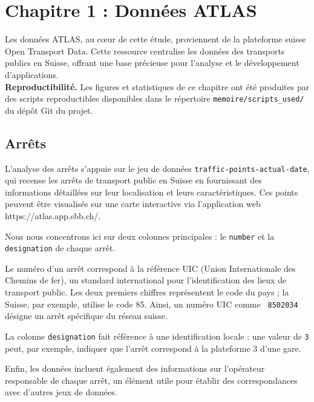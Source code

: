 \chapter{Chapitre 1 : Données ATLAS}

Les données ATLAS, au cœur de cette étude, proviennent de la plateforme suisse Open Transport Data. Cette ressource centralise les données des transports publics en Suisse, offrant une base précieuse pour l'analyse et le développement d'applications.\\

\medskip
\noindent\textbf{Reproductibilité.} Les figures et statistiques de ce chapitre ont été produites par des scripts reproductibles disponibles dans le répertoire \texttt{memoire/scripts\_used/} du dépôt Git du projet.


\section{Arrêts}

L'analyse des arrêts s'appuie sur le jeu de données \texttt{traffic-points-actual-date}, qui recense les arrêts de transport public en Suisse en fournissant des informations détaillées sur leur localisation et leurs caractéristiques. Ces points peuvent être visualisés sur une carte interactive via l’application web https://atlas.app.sbb.ch/.

Nous nous concentrons ici sur deux colonnes principales : le \texttt{number} et la \texttt{designation} de chaque arrêt.

Le numéro d’un arrêt correspond à la référence UIC (Union Internationale des Chemins de fer), un standard international pour l'identification des lieux de transport public. Les deux premiers chiffres représentent le code du pays ; la Suisse, par exemple, utilise le code 85. Ainsi, un numéro UIC comme \texttt{ 8502034} désigne un arrêt spécifique du réseau suisse.

La colonne \texttt{designation} fait référence à une identification locale : une valeur de \texttt{3} peut, par exemple, indiquer que l’arrêt correspond à la plateforme 3 d’une gare.

Enfin, les données incluent également des informations sur l’opérateur responsable de chaque arrêt, un élément utile pour établir des correspondances avec d’autres jeux de données.

